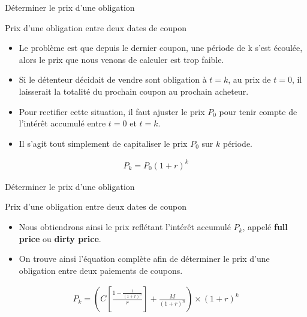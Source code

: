 \documentclass[11pt]{beamer}
\begin{document}
\begin{frame}{Déterminer le prix d'une obligation}
\begin{block}{Prix d'une obligation entre deux dates de coupon}
\begin{itemize}
\item Le problème est que depuis le dernier coupon, une période de k s'est écoulée, alors le prix que nous venons de calculer est trop faible. 
\item Si le détenteur décidait de vendre sont obligation à $t= k$, au prix de $t=0$, il laisserait la totalité du prochain coupon au prochain acheteur.
\item Pour rectifier cette situation, il faut ajuster le prix $P_0$ pour tenir compte de l'intérêt accumulé entre $t=0$ et $t=k$. 
\item Il s'agit tout simplement de capitaliser le prix $P_0$ sur $k$ période. 
\end{itemize}
\begin{align*}
P_k=P_0 (1+r)^k
\end{align*}
\end{block}
\end{frame}

\begin{frame}{Déterminer le prix d'une obligation}
\begin{block}{Prix d'une obligation entre deux dates de coupon}
\begin{itemize}
\item Nous obtiendrons ainsi le prix reflétant l'intérêt accumulé $P_k$, appelé \textbf{full price} ou \textbf{dirty price}. 
\item On trouve ainsi l'équation complète afin de déterminer le prix d'une obligation entre deux paiements de coupons.
\end{itemize}
\begin{align*}
P_k= \left( C \left[ \frac{1-\frac{1}{(1+r)^n}}{r} \right]+\frac{M}{(1+r)^n} \right) \times (1+r)^k
\end{align*}
\end{block}
\end{frame}
\end{document}

